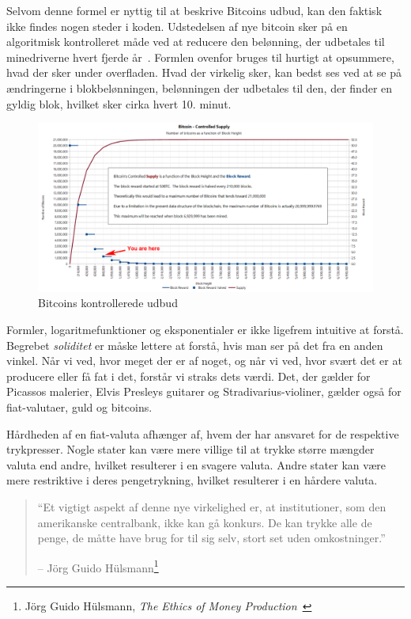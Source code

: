 \documentclass[paper=6in:9in,pagesize=pdftex,headinclude=on,footinclude=on,12pt]{scrbook}
\begin{document}
Selvom denne formel er nyttig til at beskrive Bitcoins udbud, kan den faktisk ikke findes nogen steder i koden. Udstedelsen af nye bitcoin sker på en algoritmisk kontrolleret måde ved at reducere den belønning, der udbetales til minedriverne hvert fjerde år~\cite{btcwiki:supply}. Formlen ovenfor bruges til hurtigt at opsummere, hvad der sker under overfladen. Hvad der virkelig sker, kan bedst ses ved at se på ændringerne i blokbelønningen, belønningen der udbetales til den, der finder en gyldig blok, hvilket sker cirka hvert 10. minut.\begin{figure}
  \includegraphics{assets/images/you-are-here.png}
  \caption{Bitcoins kontrollerede udbud}
  \label{fig:you-are-here.png}
\end{figure}

Formler, logaritmefunktioner og eksponentialer er ikke ligefrem intuitive at forstå. Begrebet \textit{soliditet} er måske lettere at forstå, hvis man ser på det fra en anden vinkel. Når vi ved, hvor meget der er af noget, og når vi ved, hvor svært det er at producere eller få fat i det, forstår vi straks dets værdi. Det, der gælder for Picassos malerier, Elvis Presleys guitarer og Stradivarius-violiner, gælder også for fiat-valutaer, guld og bitcoins.

Hårdheden af en fiat-valuta afhænger af, hvem der har ansvaret for de respektive trykpresser. Nogle stater kan være mere villige til at trykke større mængder valuta end andre, hvilket resulterer i en svagere valuta. Andre stater kan være mere restriktive i deres pengetrykning, hvilket resulterer i en hårdere valuta.\begin{samepage}\begin{quotation} \enquote{Et vigtigt aspekt af denne nye virkelighed er, at institutioner, som den amerikanske centralbank, ikke kan gå konkurs. De kan trykke alle de penge, de måtte have brug for til sig selv, stort set uden omkostninger.} \begin{flushright} -- Jörg Guido Hülsmann\footnote{Jörg Guido Hülsmann, \textit{The Ethics of Money Production}~\cite{hulsmann2008ethics}}
\end{flushright}\end{quotation}\end{samepage}
\end{document}
